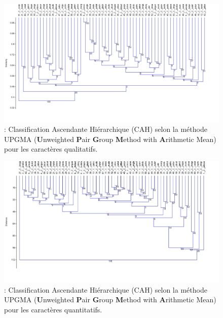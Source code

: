 \documentclass[a4paper]{article}
\theoremstyle{definition}
\theoremstyle{definition}
\theoremstyle{definition}
\theoremstyle{remark}
\begin{document}
\begin{figure}[H]

{\centering \includegraphics[width=1\linewidth]{figure/fig10b} 

}

\caption{: Classification Ascendante Hiérarchique (CAH) selon la
méthode UPGMA (\textbf{U}nweighted \textbf{P}air \textbf{G}roup
\textbf{M}ethod with \textbf{A}rithmetic Mean) pour les caractères
qualitatifs.}\label{fig:fig10b}
\end{figure}






\begin{figure}[H]

{\centering \includegraphics[width=1\linewidth]{figure/fig10c} 

}

\caption{: Classification Ascendante Hiérarchique (CAH) selon la
méthode UPGMA (\textbf{U}nweighted \textbf{P}air \textbf{G}roup
\textbf{M}ethod with \textbf{A}rithmetic Mean) pour les caractères
quantitatifs.}\label{fig:fig10c}
\end{figure}
\end{document}
